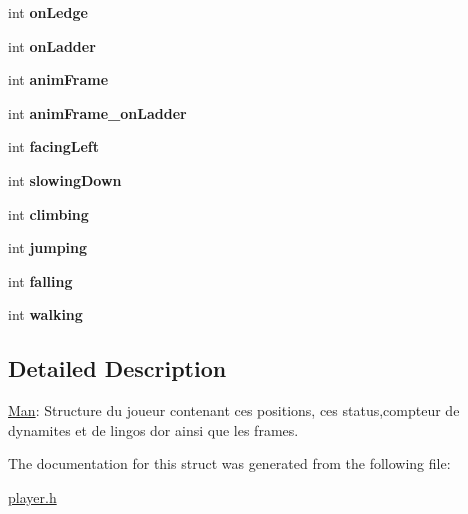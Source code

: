 \begin{DoxyCompactItemize}
\item 
\hypertarget{struct_man_a2bc6c8b4044ae1bccc5bca5c7ae4dae3}{}int {\bfseries on\+Ledge}\label{struct_man_a2bc6c8b4044ae1bccc5bca5c7ae4dae3}

\item 
\hypertarget{struct_man_aba8c5a99ba1edaefd18c59c7354b3b2e}{}int {\bfseries on\+Ladder}\label{struct_man_aba8c5a99ba1edaefd18c59c7354b3b2e}

\item 
\hypertarget{struct_man_a957cf55a734fb1b1bf6fb226fedc5bef}{}int {\bfseries anim\+Frame}\label{struct_man_a957cf55a734fb1b1bf6fb226fedc5bef}

\item 
\hypertarget{struct_man_a4d317684d90ff7d1adbb5184c9f00d14}{}int {\bfseries anim\+Frame\+\_\+on\+Ladder}\label{struct_man_a4d317684d90ff7d1adbb5184c9f00d14}

\item 
\hypertarget{struct_man_a2201bf9a8f0740e580cee7927d756f7f}{}int {\bfseries facing\+Left}\label{struct_man_a2201bf9a8f0740e580cee7927d756f7f}

\item 
\hypertarget{struct_man_a2a1b749279a503bd878d1bdfccf91615}{}int {\bfseries slowing\+Down}\label{struct_man_a2a1b749279a503bd878d1bdfccf91615}

\item 
\hypertarget{struct_man_a1e454f0294a1086abc32ff996c7f242e}{}int {\bfseries climbing}\label{struct_man_a1e454f0294a1086abc32ff996c7f242e}

\item 
\hypertarget{struct_man_ad427edc16087f64ef18fb771dd34cc0b}{}int {\bfseries jumping}\label{struct_man_ad427edc16087f64ef18fb771dd34cc0b}

\item 
\hypertarget{struct_man_a6366fcd8a490f866e08b40fafbde6781}{}int {\bfseries falling}\label{struct_man_a6366fcd8a490f866e08b40fafbde6781}

\item 
\hypertarget{struct_man_a71c724602c8bfef366018528fc436359}{}int {\bfseries walking}\label{struct_man_a71c724602c8bfef366018528fc436359}

\end{DoxyCompactItemize}


\subsection{Detailed Description}
\hyperlink{struct_man}{Man}\+: Structure du joueur contenant ces positions, ces status,compteur de dynamites et de lingos d\textquotesingle{}or ainsi que les frames. 

The documentation for this struct was generated from the following file\+:\begin{DoxyCompactItemize}
\item 
\hyperlink{player_8h}{player.\+h}\end{DoxyCompactItemize}
